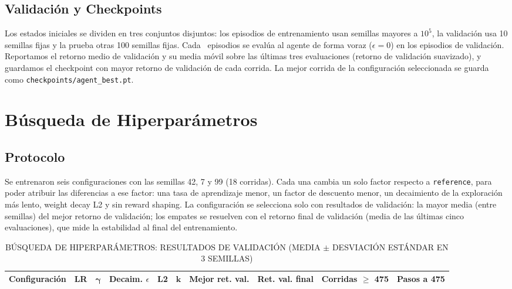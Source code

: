 \documentclass[conference]{IEEEtran}
\begin{document}
\subsection{Validación y Checkpoints}
Los estados iniciales se dividen en tres conjuntos disjuntos: los episodios de
entrenamiento usan semillas mayores a $10^5$, la validación usa 10 semillas fijas y la
prueba otras 100 semillas fijas. Cada \EvalEvery\ episodios se evalúa al agente de forma
voraz ($\epsilon = 0$) en los episodios de validación. Reportamos el retorno medio de
validación y su media móvil sobre las últimas tres evaluaciones (retorno de validación
suavizado), y guardamos el checkpoint con mayor retorno de validación de cada corrida. La
mejor corrida de la configuración seleccionada se guarda como
\texttt{checkpoints/agent\_best.pt}.

\section{Búsqueda de Hiperparámetros}

\subsection{Protocolo}
Se entrenaron seis configuraciones con las semillas 42, 7 y 99 (18 corridas). Cada una
cambia un solo factor respecto a \texttt{reference}, para poder atribuir las diferencias a
ese factor: una tasa de aprendizaje menor, un factor de descuento menor, un decaimiento de
la exploración más lento, weight decay L2 y sin reward shaping. La configuración se
selecciona solo con resultados de validación: la mayor media (entre semillas) del mejor
retorno de validación; los empates se resuelven con el retorno final de validación (media de
las últimas cinco evaluaciones), que mide la estabilidad al final del entrenamiento.

\begin{table}[t]
\caption{BÚSQUEDA DE HIPERPARÁMETROS: RESULTADOS DE VALIDACIÓN (MEDIA $\pm$ DESVIACIÓN ESTÁNDAR EN 3 SEMILLAS)}
\label{tab:sweep}
\centering
\small
\setlength{\tabcolsep}{4pt}
\begin{tabular}{|l|c|c|c|c|c|c|c|c|c|}
\hline
\textbf{Configuración} & \textbf{LR} & $\boldsymbol{\gamma}$ & \textbf{Decaim. $\epsilon$} & \textbf{L2} & $\boldsymbol{k}$ &
\textbf{Mejor ret. val.} & \textbf{Ret. val. final} & \textbf{Corridas $\geq$ 475} & \textbf{Pasos a 475} \\ \hline

\end{tabular}
\end{table}
\end{document}
